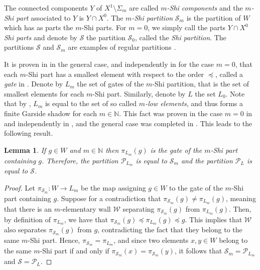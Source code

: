 \documentclass[a4paper,12pt,leqno]{amsart}
\newtheorem{lemma}[theorem]{Lemma}
\theoremstyle{definition}
\newcommand{\N}{\mathbb{N}}
\newcommand{\W}{\mathcal{W}}
\begin{document}
The connected components $Y$ of $X^1 \setminus \Sigma_m$ are called $m$\emph{-Shi components} and the $m$\emph{-Shi part} associated to $Y$ is $Y \cap X^0$. The $m$\emph{-Shi partition} $\mathscr{S}_m$ is the partition of $W$ which has as parts the $m$-Shi parts. For $m=0$, we simply call the parts $Y \cap X^0$ \emph{Shi parts} and denote by $\mathscr{S}$ the partition $\mathscr{S}_0$, called the \emph{Shi partition}. The partitions $\mathscr{S}$ and $\mathscr{S}_m$ are examples of regular partitions \cite[Thm 3.11]{PaY-reg}. 

It is proven in \cite{DHFM24} in the general case, and independently in \cite{PrY-pair} for the case $m=0$, that each $m$-Shi part has a smallest element with respect to the order $\preceq$, called a \emph{gate} in \cite{PaY-reg}. Denote by $L_m$ the set of gates of the $m$-Shi partition, that is the set of smallest elements for each $m$-Shi part. Similarly, denote by $L$ the set $L_0$. Note that by \cite[Thm 1.1]{DHFM24}, $L_m$ is equal to the set of so called $m$\emph{-low elements}, and thus forms a finite Garside shadow for each $m \in \N$. This fact was proven in the case $m=0$ in \cite{DH-Garside} and independently in \cite{PrY-pair}, and the general case was completed in \cite{D-mlow}. This leads to the following result.

\begin{lemma} \label{lem-mShi}
    If $g \in W$ and $m \in \N$ then $\pi_{L_m}(g)$ is the gate of the $m$-Shi part containing $g$. Therefore, the partition $\mathscr{P}_{L_m}$ is equal to $\mathscr{S}_m$ and the partition $\mathscr{P}_L$ is equal to $\mathscr{S}$.
\end{lemma}

\begin{proof}
    Let $\pi_{\mathscr{S}_m} : W \to L_m$ be the map assigning $g \in W$ to the gate of the $m$-Shi part containing $g$. Suppose for a contradiction that $\pi_{\mathscr{S}_m}(g) \neq \pi_{L_m}(g)$, meaning that there is an $m$-elementary wall $\W$ separating $\pi_{\mathscr{S}_m}(g)$ from $\pi_{L_m}(g)$. Then, by definition of $\pi_{L_m}$, we have that $\pi_{\mathscr{S}_m}(g) \preceq \pi_{L_m}(g) \preceq g$. This implies that $\W$ also separates $\pi_{\mathscr{S}_m}(g)$ from $g$, contradicting the fact that they belong to the same $m$-Shi part. Hence, $\pi_{\mathscr{S}_m} = \pi_{L_m}$, and since two elements $x,y \in W$ belong to the same $m$-Shi part if and only if $\pi_{\mathscr{S}_m}(x) = \pi_{\mathscr{S}_m}(y)$, it follows that $\mathscr{S}_m = \mathscr{P}_{L_m}$ and $\mathscr{S} = \mathscr{P}_L$.
\end{proof}
\end{document}
